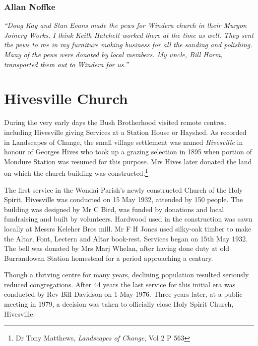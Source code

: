 \subsubsection{Allan Noffke}



\emph{``Doug Kay and Stan Evans made the pews for Windera church in their Murgon Joinery Works. I think Keith Hatchett worked there at the time as well. They sent the pews to me in my furniture making business for all the sanding and polishing. Many of the pews were donated by local members. My uncle, Bill Harm, transported them out to Windera for us.''}



\section{Hivesville Church}



During the very early days the Bush Brotherhood visited remote centres, including Hivesville giving Services at a Station House or Hayshed. As recorded in Landscapes of Change, the small village settlement was named \emph{Hivesville} in honour of Georges Hives who took up a grazing selection in 1895 when portion of Mondure Station was resumed for this purpose. Mrs Hives later donated the land on which the church building was constructed.\footnote{Dr Tony Matthews, \emph{Landscapes of Change}, Vol 2 P 563}


The first service in the Wondai Parish's newly constructed Church of the Holy Spirit, Hivesville was conducted on 15 May 1932, attended by 150 people. The building was designed by Mr C Bird, was funded by donations and local fundraising and built by volunteers. Hardwood used in the construction was sawn locally at Messrs Keleher Bros mill. Mr F H Jones used silky-oak timber to make the Altar, Font, Lectern and Altar book-rest. Services began on 15th May 1932. The bell was donated by Mrs Marj Whelan, after having done duty at old Burrandowan Station homestead for a period approaching a century.



Though a thriving centre for many years, declining population resulted seriously reduced congregations. After 44 years the last service for this initial era was conducted by Rev Bill Davidson on 1 May 1976. Three years later, at a public meeting in 1979, a decision was taken to officially close Holy Spirit Church, Hivesville.



